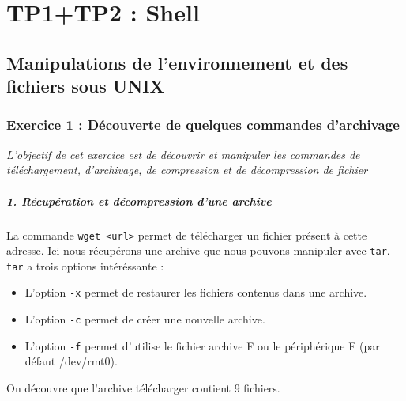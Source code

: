 \chapter{TP1+TP2 : Shell}

\section{Manipulations de l’environnement et des fichiers sous UNIX}

\subsection{Exercice 1 : Découverte de quelques commandes d'archivage}
\textit{L'objectif de cet exercice est de découvrir et manipuler les commandes de téléchargement, d'archivage, de compression et de décompression de fichier}

\paragraph{1. Récupération et décompression d'une archive}
La commande \texttt{wget <url>} permet de télécharger un fichier présent à cette adresse. Ici nous récupérons une archive que nous pouvons manipuler avec \texttt{tar}. \texttt{tar} a trois options intéréssante :
\begin{itemize}
  \item L'option \texttt{-x} permet de restaurer les fichiers contenus dans une archive.
  \item L'option \texttt{-c} permet de créer une nouvelle archive.
  \item L'option \texttt{-f} permet d'utilise le fichier archive F ou le périphérique F (par défaut /dev/rmt0).
\end{itemize}
On découvre que l'archive télécharger contient 9 fichiers.

